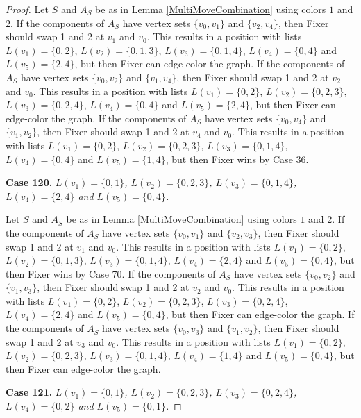 \documentclass[12pt]{amsart}
\theoremstyle{plain}
\theoremstyle{definition}
\theoremstyle{remark}
\begin{document}
\begin{proof}
Let $S$ and $A_S$ be as in Lemma \ref{MultiMoveCombination} using colors $1$ and $2$. If the components of $A_S$ have vertex sets $\{v_0, v_1\}$ and $\{v_2, v_4\}$, then Fixer should swap 1 and 2 at $v_1$ and $v_0$. This results in a position with lists $L(v_1) = \{0, 2\}$, $L(v_2) = \{0, 1, 3\}$, $L(v_3) = \{0, 1, 4\}$, $L(v_4) = \{0, 4\}$ and $L(v_5) = \{2, 4\}$, but then Fixer can edge-color the graph.
If the components of $A_S$ have vertex sets $\{v_0, v_2\}$ and $\{v_1, v_4\}$, then Fixer should swap 1 and 2 at $v_2$ and $v_0$. This results in a position with lists $L(v_1) = \{0, 2\}$, $L(v_2) = \{0, 2, 3\}$, $L(v_3) = \{0, 2, 4\}$, $L(v_4) = \{0, 4\}$ and $L(v_5) = \{2, 4\}$, but then Fixer can edge-color the graph.
If the components of $A_S$ have vertex sets $\{v_0, v_4\}$ and $\{v_1, v_2\}$, then Fixer should swap 1 and 2 at $v_4$ and $v_0$. This results in a position with lists $L(v_1) = \{0, 2\}$, $L(v_2) = \{0, 2, 3\}$, $L(v_3) = \{0, 1, 4\}$, $L(v_4) = \{0, 4\}$ and $L(v_5) = \{1, 4\}$, but then Fixer wins by Case 36.

\noindent\textbf{Case 120.  }\textit{$L(v_1) = \{0, 1\}$, $L(v_2) = \{0, 2, 3\}$, $L(v_3) = \{0, 1, 4\}$, $L(v_4) = \{2, 4\}$ and $L(v_5) = \{0, 4\}$.}

Let $S$ and $A_S$ be as in Lemma \ref{MultiMoveCombination} using colors $1$ and $2$. If the components of $A_S$ have vertex sets $\{v_0, v_1\}$ and $\{v_2, v_3\}$, then Fixer should swap 1 and 2 at $v_1$ and $v_0$. This results in a position with lists $L(v_1) = \{0, 2\}$, $L(v_2) = \{0, 1, 3\}$, $L(v_3) = \{0, 1, 4\}$, $L(v_4) = \{2, 4\}$ and $L(v_5) = \{0, 4\}$, but then Fixer wins by Case 70.
If the components of $A_S$ have vertex sets $\{v_0, v_2\}$ and $\{v_1, v_3\}$, then Fixer should swap 1 and 2 at $v_2$ and $v_0$. This results in a position with lists $L(v_1) = \{0, 2\}$, $L(v_2) = \{0, 2, 3\}$, $L(v_3) = \{0, 2, 4\}$, $L(v_4) = \{2, 4\}$ and $L(v_5) = \{0, 4\}$, but then Fixer can edge-color the graph.
If the components of $A_S$ have vertex sets $\{v_0, v_3\}$ and $\{v_1, v_2\}$, then Fixer should swap 1 and 2 at $v_3$ and $v_0$. This results in a position with lists $L(v_1) = \{0, 2\}$, $L(v_2) = \{0, 2, 3\}$, $L(v_3) = \{0, 1, 4\}$, $L(v_4) = \{1, 4\}$ and $L(v_5) = \{0, 4\}$, but then Fixer can edge-color the graph.

\noindent\textbf{Case 121.  }\textit{$L(v_1) = \{0, 1\}$, $L(v_2) = \{0, 2, 3\}$, $L(v_3) = \{0, 2, 4\}$, $L(v_4) = \{0, 2\}$ and $L(v_5) = \{0, 1\}$.}


\end{proof}
\end{document}

